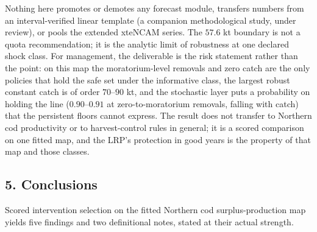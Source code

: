 \documentclass[11pt]{article}
\begin{document}
Nothing here promotes or demotes any forecast module, transfers numbers
from an interval-verified linear template (a companion methodological
study, under review), or pools the extended xteNCAM series. The \(57.6\)
kt boundary is not a quota recommendation; it is the analytic limit of
robustness at one declared shock class. For management, the deliverable
is the risk statement rather than the point: on this map the
moratorium-level removals and zero catch are the only policies that hold
the safe set under the informative class, the largest robust constant
catch is of order \(70\)--\(90\) kt, and the stochastic layer puts a
probability on holding the line (\(0.90\)--\(0.91\) at
zero-to-moratorium removals, falling with catch) that the persistent
floors cannot express. The result does not transfer to Northern cod
productivity or to harvest-control rules in general; it is a scored
comparison on one fitted map, and the LRP's protection in good years is
the property of that map and those classes.

\subsection{5. Conclusions}\label{conclusions}

Scored intervention selection on the fitted Northern cod
surplus-production map yields five findings and two definitional notes,
stated at their actual strength.
\end{document}
